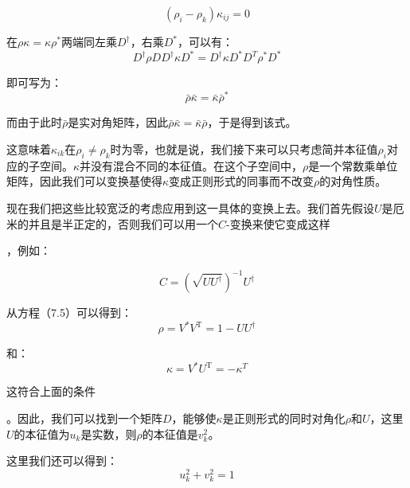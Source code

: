 \[
(\rho_{i}-\rho_{k})\kappa_{ij}=0
\]

\begin{booknote*}
在$\rho\kappa=\kappa\rho^{*}$两端同左乘$D^{\dagger}$，右乘$D^{*}$，可以有： 
\[
D^{\dagger}\rho DD^{\dagger}\kappa D^{*}=D^{\dagger}\kappa D^{*}D^{T}\rho^{*}D^{*}
\]

即可写为：
\[
\bar{\rho}\bar{\kappa}=\bar{\kappa}\bar{\rho}^{*}
\]

而由于此时$\bar{\rho}$是实对角矩阵，因此$\bar{\rho}\bar{\kappa}=\bar{\kappa}\bar{\rho}$，于是得到该式。
\end{booknote*}
这意味着$\kappa_{ik}$在$\rho_{i}\neq\rho_{k}$时为零，也就是说，我们接下来可以只考虑简并本征值$\rho_{i}$对应的子空间。$\kappa$并没有混合不同的本征值。在这个子空间中，$\rho$是一个常数乘单位矩阵，因此我们可以变换基使得$\kappa$变成正则形式的同事而不改变$\rho$的对角性质。

现在我们把这些比较宽泛的考虑应用到这一具体的变换上去。我们首先假设$U$是厄米的并且是半正定的，否则我们可以用一个$C$-变换来使它变成这样

，例如：

\[
C=(\sqrt{UU^{\dagger}})^{-1}U^{\dagger}
\]

从方程（7.5）可以得到：
\begin{equation}
\rho=V^{*}V^{\mathrm{T}}=1-UU^{\dagger}\label{eq:def of rho}
\end{equation}

和：
\begin{equation}
\kappa=V^{*}U^{\mathrm{T}}=-\kappa^{T}\label{eq:def of kappa}
\end{equation}

这符合上面的条件

。因此，我们可以找到一个矩阵$D$，能够使$\kappa$是正则形式的同时对角化$\rho$和$U$，这里$U$的本征值为$u_{k}$是实数，则$\rho$的本征值是$v^{2}_{k}$。

这里我们还可以得到：
\[
u^{2}_{k}+v^{2}_{k}=1
\]


